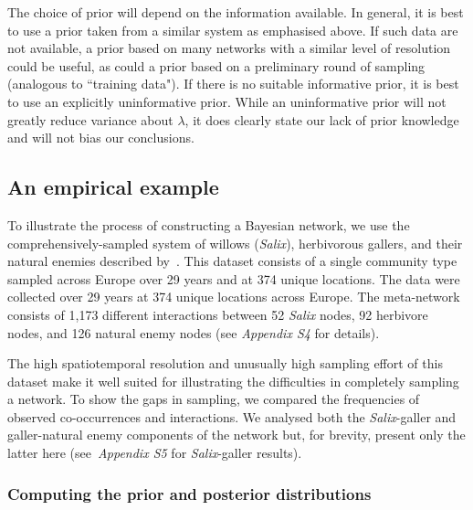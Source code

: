 \documentclass[12pt]{article}
\begin{document}
\begin{spacing}{2.0}
      The choice of prior will depend on the information available. In general, it is best to use a prior taken from a similar system as emphasised above. If such data are not available, a prior based on many networks with a similar level of resolution could be useful, as could a prior based on a preliminary round of sampling (analogous to ``training data"). If there is no suitable informative prior, it is best to use an explicitly uninformative prior. While an uninformative prior will not greatly reduce variance about $\lambda$, it does clearly state our lack of prior knowledge and will not bias our conclusions.


  \subsection*{An empirical example}

      To illustrate the process of constructing a Bayesian network, we use the comprehensively-sampled system of willows (\emph{Salix}), herbivorous gallers, and their natural enemies described by~\citet{Kopelke2017}. This dataset consists of a single community type sampled across Europe over 29 years and at 374 unique locations. The data were collected over 29 years at 374 unique locations across Europe. The meta-network consists of 1,173 different interactions between 52 \emph{Salix} nodes, 92 herbivore nodes, and 126 natural enemy nodes (see \emph{Appendix S4} for details). 


      The high spatiotemporal resolution and unusually high sampling effort of this dataset make it well suited for illustrating the difficulties in completely sampling a network. To show the gaps in sampling, we compared the frequencies of observed co-occurrences and interactions. We analysed both the \emph{Salix}-galler and galler-natural enemy components of the network but, for brevity, present only the latter here (see~\emph{Appendix S5} for \emph{Salix}-galler results). 


    \subsubsection*{Computing the prior and posterior distributions}


\end{spacing}
\end{document}
